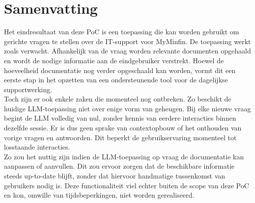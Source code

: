 \section{Samenvatting}


Het eindresultaat van deze PoC is een toepassing die kan worden gebruikt om gerichte vragen te stellen over de IT-support voor MyMinfin. De toepassing werkt zoals verwacht. Afhankelijk van de vraag worden relevante documenten opgehaald en wordt de nodige informatie aan de eindgebruiker verstrekt. Hoewel de hoeveelheid documentatie nog verder opgeschaald kan worden, vormt dit een eerste stap in het opzetten van een ondersteunende tool voor de dagelijkse supportwerking.
\\[1em]
Toch zijn er ook enkele zaken die momenteel nog ontbreken. Zo beschikt de huidige LLM-toepassing niet over enige vorm van geheugen. Bij elke nieuwe vraag begint de LLM volledig van nul, zonder kennis van eerdere interacties binnen dezelfde sessie. Er is dus geen sprake van contextopbouw of het onthouden van vorige vragen en antwoorden. Dit beperkt de gebruikservaring momenteel tot losstaande interacties.
\\[1em]
Zo zou het nuttig zijn indien de LLM-toepassing op vraag de documentatie kan aanpassen of aanvullen. Dit zou ervoor zorgen dat de beschikbare informatie steeds up-to-date blijft, zonder dat hiervoor handmatige tussenkomst van gebruikers nodig is. Deze functionaliteit viel echter buiten de scope van deze PoC en kon, omwille van tijdsbeperkingen, niet worden gerealiseerd.
